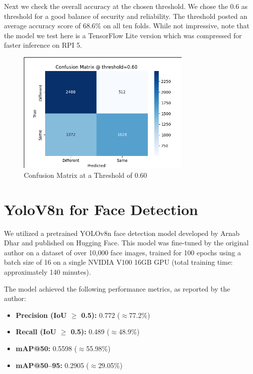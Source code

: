 \clearpage
Next we check the overall accuracy at the chosen threshold. We chose the 0.6 as threshold for a good balance of security and reliability. The threshold posted an average accuracy score of 68.6\% on all ten folds. While not impressive, note that the model we test here is a TensorFlow Lite version which was compressed for faster inference on RPI 5.
\begin{figure}[h] %
	\centering
	\includegraphics[width=0.75\textwidth]{figures/chapter4/fixed_thresh_matrix.png} %
	\caption{Confusion Matrix at a Threshold of 0.60}
	\label{fig:fixed_thresh}
\end{figure}



\section{YoloV8n for Face Detection}
We utilized a pretrained YOLOv8n face detection model developed by Arnab Dhar and published on Hugging Face. This model was fine-tuned by the original author on a dataset of over 10{,}000 face images, trained for 100 epochs using a batch size of 16 on a single NVIDIA V100 16GB GPU (total training time: approximately 140 minutes).

The model achieved the following performance metrics, as reported by the author:

\begin{itemize}
	\item \textbf{Precision (IoU $\geq$ 0.5):} 0.772 ($\approx$77.2\%)
	\item \textbf{Recall (IoU $\geq$ 0.5):} 0.489 ($\approx$48.9\%)
	\item \textbf{mAP@50:} 0.5598 ($\approx$55.98\%)
	\item \textbf{mAP@50--95:} 0.2905 ($\approx$29.05\%)
\end{itemize}


